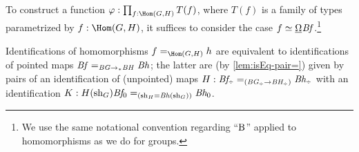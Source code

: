 \begin{remark}\label{rem:Bf-convention}
  To construct a function $\varphi : \prod_{f:\Hom(G,H)}T(f)$,
  where $T(f)$ is a family of types parametrized by $f:\Hom(G,H)$,
  it suffices to consider the case $f \jdeq \mkhom\Bf$.\footnote{%
    We use the same notational convention regarding ``$\mathrm{B}$''
    applied to homomorphisms as we do for groups.}

  Identifications of homomorphisms $f=_{\Hom(G,H)}h$
  are equivalent to identifications of pointed maps
  $\mathit{B}\mathit{f} =_{\mathit{B}\mathit{G}\to_\ast\mathit{B}\mathit{H}} \mathit{B}\mathit{h}$;
  the latter are (by \cref{lem:isEq-pair=}) given by
  pairs of an identification of (unpointed) maps
  $H : \Bf_\div =_{(\BG_\div \to \BH_\div)} \Bh_\div$ with an identification
  $K : H(\mathrm{sh}_G)\mathit{B}\mathit{f}_0 =_{(\mathrm{sh}_H=\mathit{B}\mathit{h}(\mathrm{sh}_G))} \mathit{B}\mathit{h}_0$.
\end{remark}

